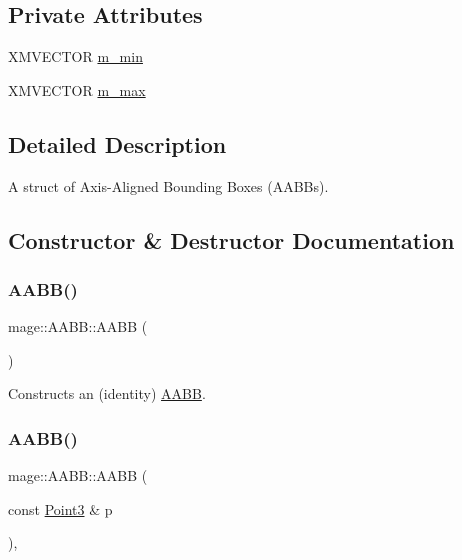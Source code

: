 \subsection*{Private Attributes}
\begin{DoxyCompactItemize}
\item 
X\+M\+V\+E\+C\+T\+OR \hyperlink{classmage_1_1_a_a_b_b_a9aa94271f73b8199a0431b0ae2abb35a}{m\+\_\+min}
\item 
X\+M\+V\+E\+C\+T\+OR \hyperlink{classmage_1_1_a_a_b_b_a9f850f5f39e4b2192dfac97c508ef052}{m\+\_\+max}
\end{DoxyCompactItemize}


\subsection{Detailed Description}
A struct of Axis-\/\+Aligned Bounding Boxes (A\+A\+B\+Bs). 

\subsection{Constructor \& Destructor Documentation}
\hypertarget{classmage_1_1_a_a_b_b_a4bf8c44135580cda2ab0c78da14c634e}{}\label{classmage_1_1_a_a_b_b_a4bf8c44135580cda2ab0c78da14c634e} 
\subsubsection{\texorpdfstring{A\+A\+B\+B()}{AABB()}\hspace{0.1cm}{\footnotesize\ttfamily [1/8]}}
{\footnotesize\ttfamily mage\+::\+A\+A\+B\+B\+::\+A\+A\+BB (\begin{DoxyParamCaption}{ }\end{DoxyParamCaption})\hspace{0.3cm}{\ttfamily [noexcept]}}

Constructs an (identity) \hyperlink{classmage_1_1_a_a_b_b}{A\+A\+BB}. \hypertarget{classmage_1_1_a_a_b_b_a97a4a755cb0b9c017fd5a311576a5c00}{}\label{classmage_1_1_a_a_b_b_a97a4a755cb0b9c017fd5a311576a5c00} 
\subsubsection{\texorpdfstring{A\+A\+B\+B()}{AABB()}\hspace{0.1cm}{\footnotesize\ttfamily [2/8]}}
{\footnotesize\ttfamily mage\+::\+A\+A\+B\+B\+::\+A\+A\+BB (\begin{DoxyParamCaption}\item[{const \hyperlink{structmage_1_1_point3}{Point3} \&}]{p }\end{DoxyParamCaption})\hspace{0.3cm}{\ttfamily [explicit]}, {\ttfamily [noexcept]}}

